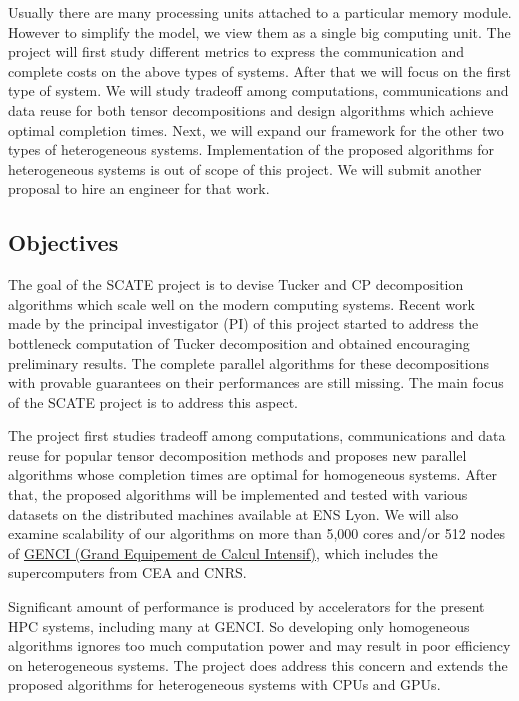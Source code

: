 \documentclass[a4paper,11pt]{article}
\newcommand{\sk}[1]{{\color{blue} \emph{#1}}}
\begin{document}
	Usually there are many processing units attached to a particular memory module. However to simplify the model, we view them as a single big computing unit.
	The project will first study different metrics to express the communication and complete costs on the above types of systems. After that we will focus on the first type of system. We will study tradeoff among computations, communications and data reuse for both tensor decompositions and design algorithms which achieve optimal completion times. Next, we will expand our framework for the other two types of heterogeneous systems. Implementation of the proposed algorithms for heterogeneous systems is out of scope of this project. We will submit another proposal to hire an engineer for that work.
	
	\subsection{Objectives}
	\label{sec:context:obj}
	
	The goal of the SCATE project is to devise Tucker and CP decomposition algorithms which scale well on the modern computing systems. Recent work~\cite{ABGKR-SIMAX-2024} made by the principal investigator (PI) of this project started to address the bottleneck computation of Tucker decomposition and obtained encouraging preliminary results. The complete parallel algorithms for these decompositions with provable guarantees on their performances are still missing. The main focus of the SCATE project is to address this aspect.
	
	The project first studies tradeoff among computations, communications and data reuse for popular tensor decomposition methods and proposes new parallel algorithms whose completion times are optimal for homogeneous systems. After that, the proposed algorithms will be implemented and tested with various datasets on the distributed machines available at ENS Lyon. We will also examine scalability of our algorithms on more than 5,000 cores and/or 512 nodes of \href{https://www.genci.fr/en/our-computers}{GENCI (Grand Equipement de Calcul Intensif)}, which includes the supercomputers from CEA and CNRS.

	
	
	Significant amount of performance is produced by accelerators for the present HPC systems, including many at GENCI. So developing only homogeneous algorithms ignores too much computation power and may result in poor efficiency on heterogeneous systems. The project does address this concern and extends the proposed algorithms for heterogeneous systems with CPUs and GPUs.
	
\end{document}
